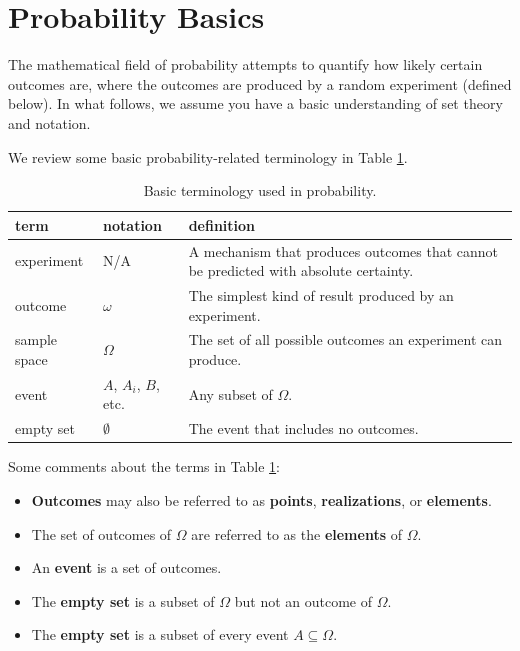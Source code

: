 \documentclass[
]{book}
\providecommand{\tightlist}{%
  \setlength{\itemsep}{0pt}\setlength{\parskip}{0pt}}
\theoremstyle{definition}
\theoremstyle{definition}
\theoremstyle{definition}
\theoremstyle{definition}
\theoremstyle{remark}
\begin{document}
\hypertarget{probability-basics}{%
\section{Probability Basics}\label{probability-basics}}

The mathematical field of probability attempts to quantify how likely certain outcomes are, where the outcomes are produced by a random experiment (defined below). In what follows, we assume you have a basic understanding of set theory and notation.

We review some basic probability-related terminology in Table \ref{tab:prob-tab1}.

\begin{table}

\caption{\label{tab:prob-tab1}Basic terminology used in probability.}
\centering
\begin{tabular}[t]{lll}
\toprule
term & notation & definition\\
\midrule
experiment & N/A & A mechanism that produces outcomes that cannot be predicted with absolute certainty.\\
outcome & $\omega$ & The simplest kind of result produced by an experiment.\\
sample space & $\Omega$ & The set of all possible outcomes an experiment can produce.\\
event & $A$, $A_i$, $B$, etc. & Any subset of $\Omega$.\\
empty set & $\emptyset$ & The event that includes no outcomes.\\
\bottomrule
\end{tabular}
\end{table}

Some comments about the terms in Table \ref{tab:prob-tab1}:

\begin{itemize}
\tightlist
\item
  \textbf{Outcomes} may also be referred to as \textbf{points}, \textbf{realizations}, or \textbf{elements}.
\item
  The set of outcomes of \(\Omega\) are referred to as the \textbf{elements} of \(\Omega\).
\item
  An \textbf{event} is a set of outcomes.
\item
  The \textbf{empty set} is a subset of \(\Omega\) but not an outcome of \(\Omega\).
\item
  The \textbf{empty set} is a subset of every event \(A\subseteq \Omega\).
\end{itemize}
\end{document}
